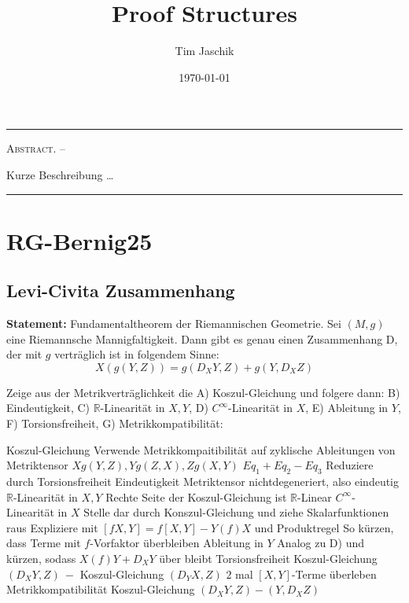 \documentclass[10pt, letterpaper]{article}
\title{Proof Structures}
\author{Tim Jaschik}
\date{\today}
\newcommand{\R}{\mathbb{R}}
\renewenvironment{abstract}
  {
    \begin{adjustwidth}{1.5cm}{1.5cm}
    \small
    \textsc{Abstract. –}%
  }
  {
    \end{adjustwidth}
  }
\begin{document}
\maketitle
\rule{\textwidth}{0.5pt}
\begin{abstract}
Kurze Beschreibung …
\end{abstract}
\rule{\textwidth}{0.5pt}
\vspace{0.5cm}




\tableofcontents
\pagebreak


\section{RG-Bernig25}




\subsection{Levi-Civita Zusammenhang}


\textbf{Statement: }{Fundamentaltheorem der Riemannischen Geometrie}.
Sei $(M, g)$ eine Riemannsche Mannigfaltigkeit. Dann gibt es genau einen Zusammenhang D, der mit $g$ verträglich ist in folgendem Sinne:
$$
X(g(Y, Z))=g\left(D_{X} Y, Z\right)+g\left(Y, D_{X} Z\right)
$$

{%
\begin{outline}
  Zeige aus der Metrikverträglichkeit die A) Koszul-Gleichung und folgere dann: B) Eindeutigkeit, C) $\R$-Linearität in $X,Y$, D) $C^\infty$-Linearität in $X$, E) Ableitung in $Y$, F) Torsionsfreiheit, G) Metrikkompatibilität: 
  
  \1 Koszul-Gleichung
  \2 Verwende Metrikkompaitibilität auf zyklische Ableitungen von Metriktensor $X g(Y, Z), Y g(Z, X), Z g(X, Y)$
  \2 $Eq_1+Eq_2-Eq_3$
  \2 Reduziere durch Torsionsfreiheit
  \1 Eindeutigkeit
  \2 Metriktensor nichtdegeneriert, also eindeutig
  \1 $\R$-Linearität in $X,Y$
  \2 Rechte Seite der Koszul-Gleichung ist $\R$-Linear
  \1 $C^\infty$-Linearität in $X$
  \2 Stelle dar durch Konszul-Gleichung und ziehe Skalarfunktionen raus
  \2 Expliziere mit $[fX,Y]=f[X,Y]-Y(f)X$ und Produktregel
  \2 So kürzen, dass Terme mit $f$-Vorfaktor überbleiben 
  \1 Ableitung in $Y$
  \2 Analog zu D) und kürzen, sodass $X(f)Y+D_XY$ über bleibt
  \1 Torsionsfreiheit
  \2 Koszul-Gleichung $(D_XY,Z) \ - $ Koszul-Gleichung $(D_YX,Z)$
  \2 $2$ mal $[X,Y]$-Terme überleben   
  \1 Metrikkompatibilität
  \2 Koszul-Gleichung $(D_XY,Z) - (Y,D_XZ)$
\end{outline}
}
\end{document}
